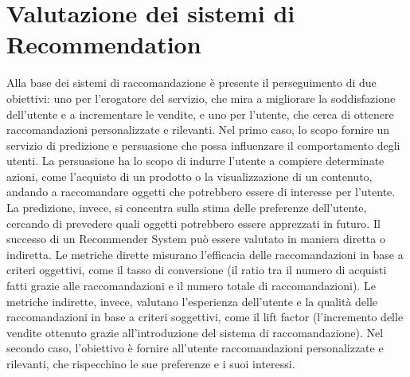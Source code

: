 \documentclass{report}
\begin{document}
	\section{Valutazione dei sistemi di Recommendation}
	Alla base dei sistemi di raccomandazione è presente il perseguimento di due obiettivi: uno per l'erogatore del servizio, che mira a migliorare la soddisfazione dell'utente e a incrementare le vendite, e uno per l'utente, che cerca di ottenere raccomandazioni personalizzate e rilevanti. Nel primo caso, lo scopo fornire un servizio di predizione e persuasione che possa influenzare il comportamento degli utenti. La persuasione ha lo scopo di indurre l'utente a compiere determinate azioni, come l'acquisto di un prodotto o la visualizzazione di un contenuto, andando a raccomandare oggetti che potrebbero essere di interesse per l'utente. La predizione, invece, si concentra sulla stima delle preferenze dell'utente, cercando di prevedere quali oggetti potrebbero essere apprezzati in futuro. Il successo di un Recommender System può essere valutato in maniera diretta o indiretta. Le metriche dirette misurano l'efficacia delle raccomandazioni in base a criteri oggettivi, come il tasso di conversione (il ratio tra il numero di acquisti fatti grazie alle raccomandazioni e il numero totale di raccomandazioni). Le metriche indirette, invece, valutano l'esperienza dell'utente e la qualità delle raccomandazioni in base a criteri soggettivi, come il lift factor (l'incremento delle vendite ottenuto grazie all'introduzione del sistema di raccomandazione). Nel secondo caso, l'obiettivo è fornire all'utente raccomandazioni personalizzate e rilevanti, che rispecchino le sue preferenze e i suoi interessi.
\end{document}
